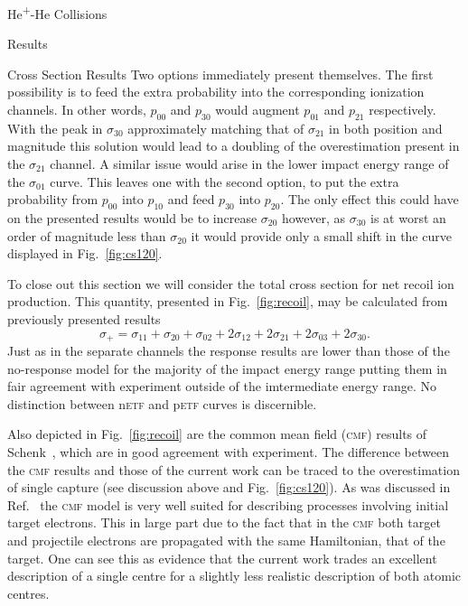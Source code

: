 \documentclass[letterpaper, 11 pt]{report}
\begin{document}
\begin{chapter}{\texorpdfstring{He\textsuperscript{+}}{He+}-He Collisions \label{chap:hephe}}
\begin{section}{Results \label{sec:hephe-disc}}
\begin{subsection}{Cross Section Results \label{sec:hephe-res}}
         Two options immediately present themselves. The first possibility is to feed the extra
         probability into the corresponding ionization channels. In other words, $p_{00}$ and $p_{30}$
         would augment $p_{01}$ and $p_{21}$ respectively. With the peak in $\sigma_{30}$ approximately
         matching that of $\sigma_{21}$ in both position and magnitude this solution would lead to a
         doubling of the overestimation present in the $\sigma_{21}$ channel. A similar issue would
         arise in the lower impact energy range of the $\sigma_{01}$ curve. This leaves one with the
         second option, to put the extra probability from $p_{00}$ into $p_{10}$ and feed $p_{30}$ into
         $p_{20}$. The only effect this could have on the presented results would be to increase
         $\sigma_{20}$ however, as $\sigma_{30}$ is at worst an order of magnitude less than
         $\sigma_{20}$ it would provide only a small shift in the curve displayed in
         Fig.~\ref{fig:cs120}.

         To close out this section we will consider the total cross section for net recoil ion
         production. This quantity, presented in Fig.~\ref{fig:recoil}, may be calculated from
         previously presented results
         \begin{equation}
            \sigma_{+} = \sigma_{11} + \sigma_{20} + \sigma_{02} + 2 \sigma_{12} + 2 \sigma_{21}
                                     + 2 \sigma_{03} + 2 \sigma_{30}.
         \end{equation}
         Just as in the separate channels the response results are lower than those of the no-response
         model for the majority of the impact energy range putting them in fair agreement with
         experiment outside of the imtermediate energy range. No distinction between n\textsc{etf} and
         p\textsc{etf} curves is discernible.

         Also depicted in Fig.~\ref{fig:recoil} are the common mean field (\textsc{cmf}) results of
         Schenk~\cite{geraldDiss}, which are in good agreement with experiment. The difference between
         the \textsc{cmf} results and those of the current work can be traced to the overestimation of
         single capture (see discussion above and Fig.~\ref{fig:cs120}). As was discussed in
         Ref.~\cite{geraldDiss} the \textsc{cmf} model is very well suited for describing processes
         involving initial target electrons. This in large part due to the fact that in the \textsc{cmf}
         both target and projectile electrons are propagated with the same Hamiltonian, that of the
         target. One can see this as evidence that the current work trades an excellent description of a
         single centre for a slightly less realistic description of both atomic centres.


\end{subsection}
\end{section}
\end{chapter}
\end{document}
